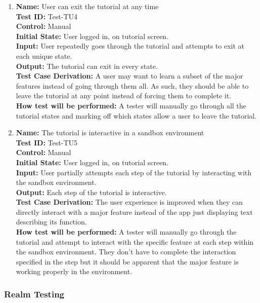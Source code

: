 \documentclass[12pt, titlepage]{article}
\begin{document}
\begin{enumerate}
    \item
    \textbf{Name:} User can exit the tutorial at any time \label{itm:Test-TU4} \\
    \textbf{Test ID:} Test-TU4 \\
    \textbf{Control:} Manual \\
    \textbf{Initial State:} User logged in, on tutorial screen. \\
    \textbf{Input:} User repeatedly goes through the tutorial and attempts to exit at each unique state. \\
    \textbf{Output:} The tutorial can exit in every state. \\
    \textbf{Test Case Derivation:} A user may want to learn a subset of the major features instead of going through them all. As such, they should be able to leave the tutorial at any point instead of forcing them to complete it. \\
    \textbf{How test will be performed:} A tester will manually go through all the tutorial states and marking off which states allow a user to leave the tutorial.

    \item
    \textbf{Name:} The tutorial is interactive in a sandbox environment \label{itm:Test-TU5} \\
    \textbf{Test ID:} Test-TU5 \\
    \textbf{Control:} Manual \\
    \textbf{Initial State:} User logged in, on tutorial screen. \\
    \textbf{Input:} User partially attempts each step of the tutorial by interacting with the sandbox environment. \\
    \textbf{Output:} Each step of the tutorial is interactive. \\
    \textbf{Test Case Derivation:} The user experience is improved when they can directly interact with a major feature instead of the app just displaying text describing its function. \\
    \textbf{How test will be performed:} A tester will manually go through the tutorial and attempt to interact with the specific feature at each step within the sandbox environment. They don't have to complete the interaction specified in the step but it should be apparent that the major feature is working properly in the environment.

\end{enumerate}

\subsubsection{Realm Testing}
\end{document}
